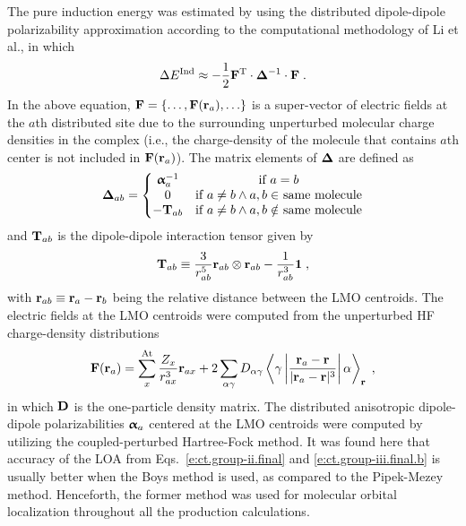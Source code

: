 \documentclass[aip,jcp,amsmath,amssymb,reprint,floatfix]{revtex4-1}
\begin{document}
The pure induction energy was estimated by using the distributed
dipole\hyp{}dipole polarizability approximation according to the computational
methodology of Li et al.,\cite{Li.Netzloff.Gordon.JCP.2006}
in which
%
\begin{equation}\label{e:ind-ref}
 \Delta E^{\rm Ind} \approx - \frac{1}{2} {\bf F}^{\rm T} \cdot {\bm{\Delta}}^{-1} \cdot {\bf F} \;.
\end{equation}
%
In the above equation, ${\bf F} = \{ \ldots, {\bf F}({\bf r}_a), \ldots\}$
is a super\hyp{}vector of electric fields at the $a$th distributed site
due to the surrounding unperturbed molecular charge densities in the complex
(i.e., the charge\hyp{}density of the molecule that contains $a$th center
is not included in ${\bf F}({\bf r}_a)$).
The matrix elements of ${\bm{\Delta}}$ are defined as
%
\begin{equation} \label{e:ind-ref.d-matrix}
 {\bm{\Delta}}_{ab} = 
\left\{\begin{matrix}
{\bm{\upalpha}}_a^{-1} &\text{if $a=b$} \\ 
0                    &\text{if $a\ne b \land a,b \in$ same molecule}\\ 
-{\bf T}_{ab}        &\text{if $a\ne b \land a,b \notin$ same molecule}
\end{matrix}\right.
\end{equation}
%
and ${\bf T}_{ab}$ is the dipole\hyp{}dipole interaction tensor
given by
%
\begin{equation} \label{e:ind-ref.t-matrix}
 {\bf T}_{ab} \equiv \frac{3}{r_{ab}^5} {\bf r}_{ab} \otimes {\bf r}_{ab}
  - \frac{1}{r_{ab}^3} {\bf 1} \;,
\end{equation}
%
with ${\bf r}_{ab} \equiv {\bf r}_{a} - {\bf r}_{b}$ being the
relative distance between the LMO centroids.
The electric fields at the LMO centroids were computed from
the unperturbed HF charge\hyp{}density distributions
%
\begin{equation} \label{e:ind-ref.efield}
 {\bf F}({\bf r}_a) = \sum_x^{\rm At} \frac{Z_x}{r_{ax}^3} {\bf r}_{ax} 
  + 2 \sum_{\alpha\gamma} D_{\alpha\gamma} 
  \left< \gamma \left| 
    \frac{{\bf r}_a - {\bf r}}{\vert {\bf r}_a - {\bf r} \vert^3}
               \right| \alpha \right>_{\bf r} \;,
\end{equation}
%
in which ${\bf D}$ is the one\hyp{}particle density matrix.
The distributed anisotropic dipole\hyp{}dipole
polarizabilities ${\bm{\upalpha}}_a$ centered at the LMO centroids
were computed by utilizing the coupled\hyp{}perturbed Hartree\hyp{}Fock
method.\cite{McWeeny.RevModPhys.1960,Dodds.McWeeney.Sadlej.MolPhys.1977} 
It was found here that accuracy of the LOA 
from Eqs.~\eqref{e:ct.group-ii.final} and \eqref{e:ct.group-iii.final.b}
is usually better 
when the Boys method\cite{Boys.RevModPhys.1960} is used, as compared
to the Pipek\hyp{}Mezey method\cite{Pipek.Mezey.JCP.1989}. Henceforth, the former
method was used for molecular orbital localization throughout all the production calculations.
\end{document}
